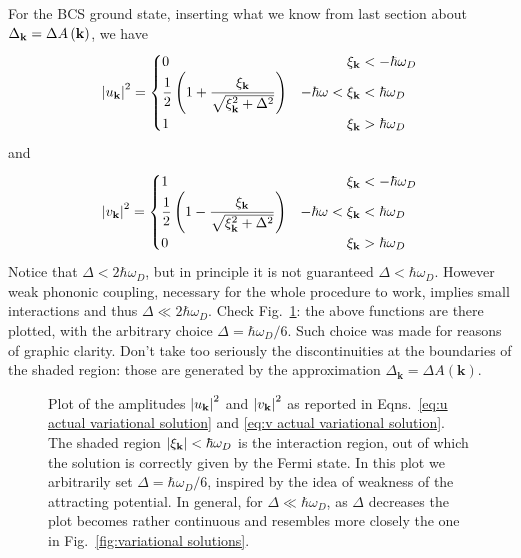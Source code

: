 For the BCS ground state, inserting what we know from last section about $\Delta_\mathbf{k} = \Delta A\left({\mathbf{k}}\right)$, we have
\begin{equation}\label{eq:u actual variational solution}
	\abs{u_\mathbf{k}}^2 = \begin{cases}
		0 &\hphantom{-\hbar\omega <{}}\xi_\mathbf{k} < -\hbar\omega_D\\
		\displaystyle\frac{1}{2} \lrR{1 + \frac{\xi_\mathbf{k}}{\sqrt{\xi_\mathbf{k}^2 + \Delta^2}}} &-\hbar\omega <\xi_\mathbf{k} < \hbar\omega_D\\
		1 &\hphantom{-\hbar\omega <{}}\xi_\mathbf{k} > \hbar\omega_D
	\end{cases}
\end{equation}
and
\begin{equation}\label{eq:v actual variational solution}
	\abs{v_\mathbf{k}}^2 = \begin{cases}
		1 &\hphantom{-\hbar\omega <{}}\xi_\mathbf{k} < -\hbar\omega_D\\
		\displaystyle\frac{1}{2} \lrR{1 - \frac{\xi_\mathbf{k}}{\sqrt{\xi_\mathbf{k}^2 + \Delta^2}}} &-\hbar\omega <\xi_\mathbf{k} < \hbar\omega_D\\
		0 &\hphantom{-\hbar\omega <{}}\xi_\mathbf{k} > \hbar\omega_D
	\end{cases}
\end{equation}
Notice that $\Delta < 2\hbar\omega_D$, but in principle it is not guaranteed $\Delta < \hbar\omega_D$. However weak phononic coupling, necessary for the whole procedure to work, implies small interactions and thus $\Delta \ll 2\hbar\omega_D$.
Check Fig.~\ref{fig:actual variational solutions}: the above functions are there plotted, with the arbitrary choice $\Delta = \hbar\omega_D/6$. Such choice was made for reasons of graphic clarity. Don't take too seriously the discontinuities at the boundaries of the shaded region: those are generated by the approximation $\Delta_\mathbf{k} = \Delta A(\mathbf{k})$.

\begin{figure}
	\centering
	
	\caption{Plot of the amplitudes $\abs{u_\mathbf{k}}^2$ and $\abs{v_\mathbf{k}}^2$ as reported in Eqns.~\eqref{eq:u actual variational solution} and \eqref{eq:v actual variational solution}. The shaded region $\abs{\xi_\mathbf{k}} < \hbar\omega_D$ is the interaction region, out of which the solution is correctly given by the Fermi state. In this plot we arbitrarily set $\Delta = \hbar\omega_D/6$, inspired by the idea of weakness of the attracting potential. In general, for $\Delta \ll \hbar\omega_D$, as $\Delta$ decreases the plot becomes rather continuous and resembles more closely the one in Fig.~\ref{fig:variational solutions}.}
	\label{fig:actual variational solutions}
\end{figure}


